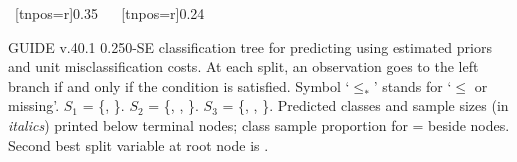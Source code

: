 \documentclass{article}
\begin{document}
\begin{landscape}
\begin{center}
{{{{ 
    ~[tnpos=r]{0.35}
    ~{}
   }
   }
    ~[tnpos=r]{0.24}
    ~{}
 }
 }
 \end{center}
GUIDE v.40.1 0.250-SE
classification tree for predicting \texttt{} using
estimated priors
and unit misclassification costs.
At each split, an observation goes to the left branch 
 if and only if the condition is satisfied.
 Symbol `$\leq_*$' stands for `$\leq$ or missing'.
 $S_{1}$ = \{\texttt{}, \texttt{}\}.
 $S_{2}$ = \{\texttt{}, \texttt{},
 \texttt{}\}.
 $S_{3}$ = \{\texttt{}, \texttt{},
 \texttt{}\}.
Predicted classes and sample sizes (in \emph{italics}) printed below terminal nodes;
class sample proportion for \texttt{} =
 \texttt{} beside nodes.
 Second best split variable at root node is \texttt{}.
 \end{landscape}
 
\end{document}
